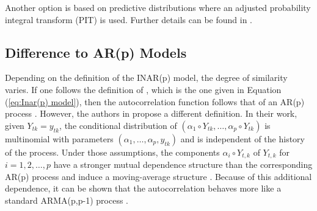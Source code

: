 Another option is based on predictive distributions where an adjusted probability integral transform (PIT) is used. Further details can be found in \textcite{Silva:2005}. 

\subsection{Difference to AR(p) Models}
\label{sec: Difference to AR models}


Depending on the definition of the INAR(p) model, the degree of similarity varies. If one follows the definition of \textcite{Guan:1991}, which is the one given in Equation (\ref{eq:Inar(p) model}), then the autocorrelation function follows that of an AR(p) process \textcite{Oliveira:2005}. However, the authors in \textcite{Alzaid:1990} propose a different definition. In their work, given $Y_{tk}=y_{tk}$, the conditional distribution of $(\alpha_1 \circ Y_{tk}, \ldots, \alpha_p \circ Y_{tk})$ is multinomial with parameters $( \alpha_1,\ldots,\alpha_p,y_{tk})$ and is independent of the history of the process. Under those assumptions, the components $\alpha_i \circ Y_{t,k}$ of $Y_{t,k}$ for $i=1,2,\ldots,p$  have a stronger mutual dependence structure than the corresponding AR(p) process and induce a moving-average structure \textcite{Alzaid:1990}. Because of this additional dependence, it can be shown that the autocorrelation behaves more like a standard ARMA(p,p-1) process \textcite{Alzaid:1990}. 